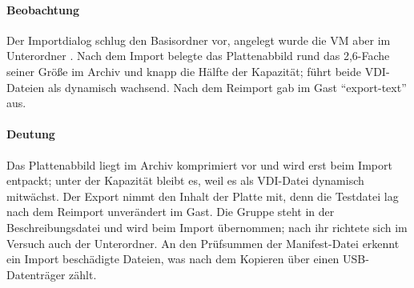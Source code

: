 \begin{messung}



\paragraph{Beobachtung} Der Importdialog schlug den Basisordner  vor, angelegt wurde die VM aber im Unterordner . Nach dem Import belegte das Plattenabbild rund das 2,6-Fache seiner Größe im Archiv und knapp die Hälfte der Kapazität;  führt beide VDI-Dateien als dynamisch wachsend. Nach dem Reimport gab  im Gast \enquote{export-text} aus.

\paragraph{Deutung} Das Plattenabbild liegt im Archiv komprimiert vor und wird erst beim Import entpackt; unter der Kapazität bleibt es, weil es als VDI-Datei dynamisch mitwächst. Der Export nimmt den Inhalt der Platte mit, denn die Testdatei lag nach dem Reimport unverändert im Gast. Die Gruppe  steht in der Beschreibungsdatei und wird beim Import übernommen; nach ihr richtete sich im Versuch auch der Unterordner. An den Prüfsummen der Manifest-Datei erkennt ein Import beschädigte Dateien, was nach dem Kopieren über einen USB-Datenträger zählt.
\end{messung}

